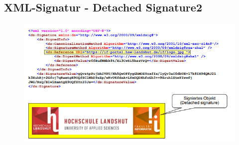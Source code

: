 \subsection{XML-Signatur - Detached Signature2}
\begin{figure}[H]
	\begin{center}
		\includegraphics[scale=0.8]{Resources/DetachedSignature2}
		\caption{}
		\label{fig:DetachedSignature2}
	\end{center}
\end{figure}





















